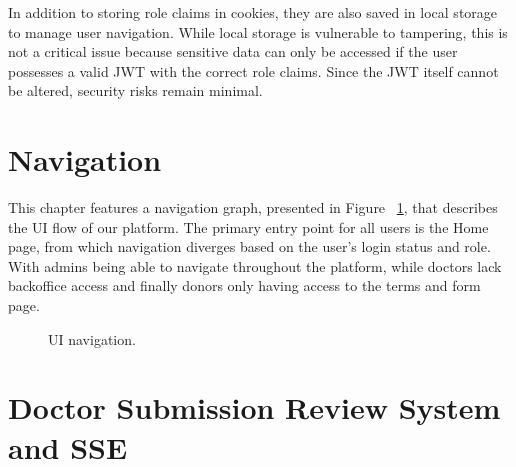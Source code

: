 In addition to storing role claims in cookies, they are also saved in local storage to manage user navigation. While local storage is vulnerable to tampering, this is not a critical issue because sensitive data can only be accessed if the user possesses a valid JWT with the correct role claims. Since the JWT itself cannot be altered, security risks remain minimal.
\section{Navigation}

This chapter features a navigation graph, presented in Figure ~\ref{fig:userNavigation}, that describes the UI flow of our platform.
The primary entry point for all users is the Home page, from which navigation diverges based on the user's login status and role.
With admins being able to navigate throughout the platform, while doctors lack backoffice access and finally donors only having access to the terms and form page.

\begin{figure}[H]
	\begin{center}
	\end{center}
	\caption{UI navigation.}\label{fig:userNavigation}
\end{figure}



\section{Doctor Submission Review System and SSE}\label{SSE_frontend}

